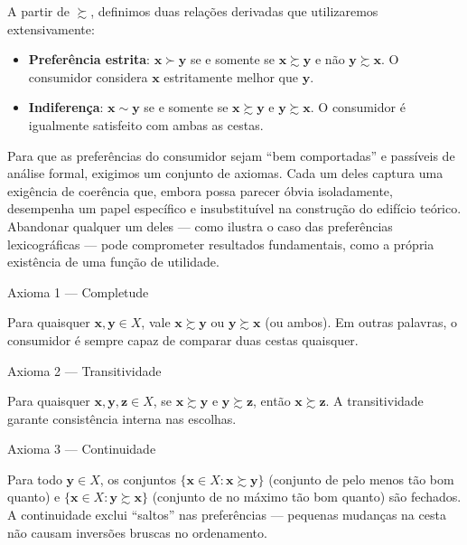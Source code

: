\documentclass[11pt,twoside,openright]{book}
\providecommand{\tightlist}{\setlength{\itemsep}{0pt}\setlength{\parskip}{0pt}}
\begin{document}
A partir de \(\succsim\), definimos duas relações derivadas que
utilizaremos extensivamente:

\begin{itemize}
\tightlist
\item
  \textbf{Preferência estrita}: \(\mathbf{x} \succ \mathbf{y}\) se e
  somente se \(\mathbf{x} \succsim \mathbf{y}\) e não
  \(\mathbf{y} \succsim \mathbf{x}\). O consumidor considera
  \(\mathbf{x}\) estritamente melhor que \(\mathbf{y}\).
\item
  \textbf{Indiferença}: \(\mathbf{x} \sim \mathbf{y}\) se e somente se
  \(\mathbf{x} \succsim \mathbf{y}\) e
  \(\mathbf{y} \succsim \mathbf{x}\). O consumidor é igualmente
  satisfeito com ambas as cestas.
\end{itemize}

Para que as preferências do consumidor sejam ``bem comportadas'' e
passíveis de análise formal, exigimos um conjunto de axiomas. Cada um
deles captura uma exigência de coerência que, embora possa parecer óbvia
isoladamente, desempenha um papel específico e insubstituível na
construção do edifício teórico. Abandonar qualquer um deles --- como
ilustra o caso das preferências lexicográficas --- pode comprometer
resultados fundamentais, como a própria existência de uma função de
utilidade.

\begin{definitionbox}{Axioma 1 — Completude}

Para quaisquer \(\mathbf{x}, \mathbf{y} \in X\), vale
\(\mathbf{x} \succsim \mathbf{y}\) ou \(\mathbf{y} \succsim \mathbf{x}\)
(ou ambos). Em outras palavras, o consumidor é sempre capaz de comparar
duas cestas quaisquer.

\end{definitionbox}

\begin{definitionbox}{Axioma 2 — Transitividade}

Para quaisquer \(\mathbf{x}, \mathbf{y}, \mathbf{z} \in X\), se
\(\mathbf{x} \succsim \mathbf{y}\) e \(\mathbf{y} \succsim \mathbf{z}\),
então \(\mathbf{x} \succsim \mathbf{z}\). A transitividade garante
consistência interna nas escolhas.

\end{definitionbox}

\begin{definitionbox}{Axioma 3 — Continuidade}

Para todo \(\mathbf{y} \in X\), os conjuntos
\(\{\mathbf{x} \in X : \mathbf{x} \succsim \mathbf{y}\}\) (conjunto de
pelo menos tão bom quanto) e
\(\{\mathbf{x} \in X : \mathbf{y} \succsim \mathbf{x}\}\) (conjunto de
no máximo tão bom quanto) são fechados. A continuidade exclui ``saltos''
nas preferências --- pequenas mudanças na cesta não causam inversões
bruscas no ordenamento.

\end{definitionbox}
\end{document}
